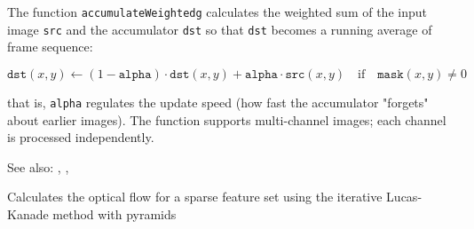 The function \texttt{accumulateWeightedg} calculates the weighted sum of the input image
\texttt{src} and the accumulator \texttt{dst} so that \texttt{dst}
becomes a running average of frame sequence:

\[ \texttt{dst}(x,y) \leftarrow (1-\texttt{alpha}) \cdot \texttt{dst}(x,y) + \texttt{alpha} \cdot \texttt{src}(x,y) \quad \text{if} \quad \texttt{mask}(x,y) \ne 0 \]

that is, \texttt{alpha} regulates the update speed (how fast the accumulator "forgets" about earlier images).
The function supports multi-channel images; each channel is processed independently.

See also: , , 

\label{calcOpticalFlowPyrLK}
Calculates the optical flow for a sparse feature set using the iterative Lucas-Kanade method with pyramids

